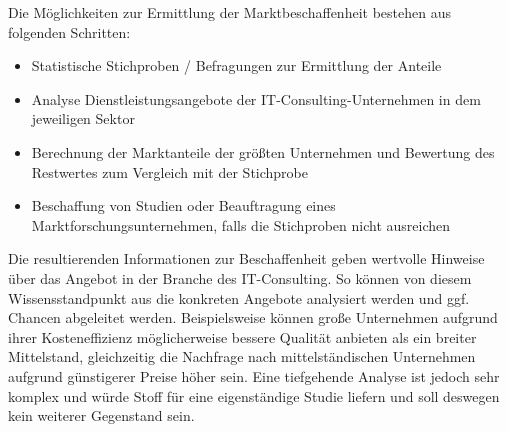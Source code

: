Die Möglichkeiten zur Ermittlung der Marktbeschaffenheit bestehen aus  folgenden Schritten:
\begin{itemize}
\item Statistische Stichproben / Befragungen zur Ermittlung der Anteile
\item Analyse Dienstleistungsangebote der IT-Consulting-Unternehmen in dem jeweiligen Sektor 
\item Berechnung der Marktanteile der größten Unternehmen und Bewertung des Restwertes zum Vergleich mit der Stichprobe
\item Beschaffung von Studien oder Beauftragung eines Marktforschungsunternehmen, falls die Stichproben nicht ausreichen
\end{itemize}
Die resultierenden Informationen zur Beschaffenheit geben wertvolle Hinweise über das Angebot in der Branche des IT-Consulting. 
So können von diesem Wissensstandpunkt aus die konkreten Angebote analysiert werden und ggf. Chancen abgeleitet werden. 
Beispielsweise können große Unternehmen aufgrund ihrer Kosteneffizienz möglicherweise bessere Qualität anbieten als ein breiter Mittelstand, gleichzeitig die Nachfrage nach mittelständischen Unternehmen aufgrund günstigerer Preise höher sein. 
Eine tiefgehende Analyse ist jedoch sehr komplex und würde Stoff für eine eigenständige Studie liefern und soll deswegen kein weiterer Gegenstand sein.

